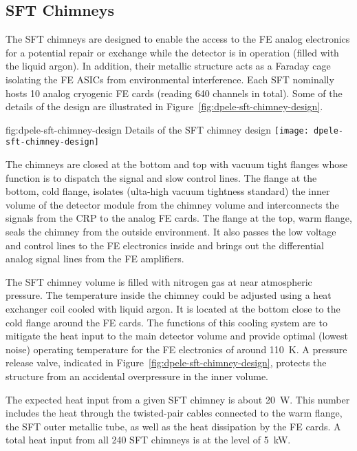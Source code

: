 \subsection{SFT Chimneys}
\label{sec:fddp-tpc-elec-design-sft}

The SFT chimneys are designed to enable the access to the FE analog electronics for a potential repair or exchange while the detector is in operation (filled with the liquid argon). In addition, their metallic structure acts as a Faraday cage isolating the FE ASICs from environmental interference.  Each SFT nominally hosts \num{10} analog cryogenic FE cards (reading \num{640} channels in total).  Some of the details of the design are illustrated in Figure~\ref{fig:dpele-sft-chimney-design}. 

\begin{dunefigure}{fig:dpele-sft-chimney-design}
{Details of the SFT chimney design}
\texttt{[image: dpele-sft-chimney-design]}
\end{dunefigure}

The chimneys are closed at the bottom and top with vacuum tight flanges whose function is to dispatch the signal and slow control lines. The flange at the bottom, cold flange, isolates (ulta-high vacuum tightness standard) the inner volume of the detector module from the chimney volume and interconnects the signals from the CRP to the analog FE cards. The flange at the top, warm flange, seals the chimney from the outside environment. It also passes the low voltage and control lines to the FE electronics inside and brings out the differential analog signal lines from the FE amplifiers. 

The SFT chimney volume is filled with nitrogen gas at near atmospheric pressure. The temperature inside the chimney could be adjusted using a heat exchanger coil cooled with liquid argon. It is located at the bottom close to the cold flange around the FE cards. The functions of this cooling system are to mitigate the heat input to the main detector volume and provide optimal (lowest noise) operating temperature for the FE electronics of around \SI{110}{K}. A pressure release valve, indicated in Figure~\ref{fig:dpele-sft-chimney-design}, protects the structure from an accidental overpressure in the inner volume. 

The expected heat input from a given SFT chimney is about \SI{20}{\watt}. This number includes the heat through the twisted-pair cables connected to the warm flange, the SFT outer metallic tube, as well as the heat dissipation by the FE cards. A total heat input from all \num{240} SFT chimneys is at the level of \SI{5}{\kilo\watt}. 

